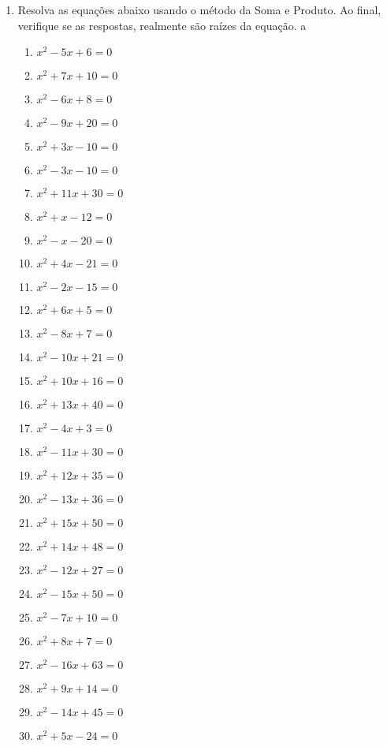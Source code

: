 \documentclass[12pt]{report}
\newcommand{\1}{\faThermometerEmpty}
\newcommand{\2}{\faThermometerQuarter}
\newcommand{\3}{\faThermometerHalf}
\newcommand{\4}{\faThermometerThreeQuarters}
\newcommand{\5}{\faThermometerFull}
\begin{document}
\begin{enumerate}
\newpage
\item Resolva as equações abaixo usando o método da Soma e Produto. Ao final, verifique se as respostas, realmente são raízes da equação.  \1 a \3
\begin{multicols}{2}
\begin{enumerate}[label=\arabic*.]
    \item $x^2 - 5x + 6 = 0$
    \item $x^2 + 7x + 10 = 0$
    \item $x^2 - 6x + 8 = 0$
    \item $x^2 - 9x + 20 = 0$
    \item $x^2 + 3x - 10 = 0$
    \item $x^2 - 3x - 10 = 0$
    \item $x^2 + 11x + 30 = 0$
    \item $x^2 + x - 12 = 0$
    \item $x^2 - x - 20 = 0$
    \item $x^2 + 4x - 21 = 0$
    \item $x^2 - 2x - 15 = 0$
    \item $x^2 + 6x + 5 = 0$
    \item $x^2 - 8x + 7 = 0$
    \item $x^2 - 10x + 21 = 0$
    \item $x^2 + 10x + 16 = 0$
    \item $x^2 + 13x + 40 = 0$
    \item $x^2 - 4x + 3 = 0$
    \item $x^2 - 11x + 30 = 0$
    \item $x^2 + 12x + 35 = 0$
    \item $x^2 - 13x + 36 = 0$
    \item $x^2 + 15x + 50 = 0$
    \item $x^2 + 14x + 48 = 0$
    \item $x^2 - 12x + 27 = 0$
    \item $x^2 - 15x + 50 = 0$
    \item $x^2 - 7x + 10 = 0$
    \item $x^2 + 8x + 7 = 0$
    \item $x^2 - 16x + 63 = 0$
    \item $x^2 + 9x + 14 = 0$
    \item $x^2 - 14x + 45 = 0$
    \item $x^2 + 5x - 24 = 0$
\end{enumerate}
\end{multicols}

\end{enumerate}
\end{document}
